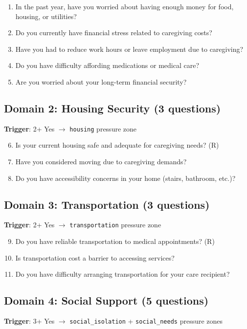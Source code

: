 \documentclass{article}
\begin{document}
\begin{enumerate}
    \item In the past year, have you worried about having enough money for food, housing, or utilities?
    \item Do you currently have financial stress related to caregiving costs?
    \item Have you had to reduce work hours or leave employment due to caregiving?
    \item Do you have difficulty affording medications or medical care?
    \item Are you worried about your long-term financial security?
\end{enumerate}

\subsection*{Domain 2: Housing Security (3 questions)}
\textbf{Trigger}: 2+ Yes $\rightarrow$ \texttt{housing} pressure zone

\begin{enumerate}
    \setcounter{enumi}{5}
    \item Is your current housing safe and adequate for caregiving needs? (R)
    \item Have you considered moving due to caregiving demands?
    \item Do you have accessibility concerns in your home (stairs, bathroom, etc.)?
\end{enumerate}

\subsection*{Domain 3: Transportation (3 questions)}
\textbf{Trigger}: 2+ Yes $\rightarrow$ \texttt{transportation} pressure zone

\begin{enumerate}
    \setcounter{enumi}{8}
    \item Do you have reliable transportation to medical appointments? (R)
    \item Is transportation cost a barrier to accessing services?
    \item Do you have difficulty arranging transportation for your care recipient?
\end{enumerate}

\subsection*{Domain 4: Social Support (5 questions)}
\textbf{Trigger}: 3+ Yes $\rightarrow$ \texttt{social\_isolation} + \texttt{social\_needs} pressure zones
\end{document}

